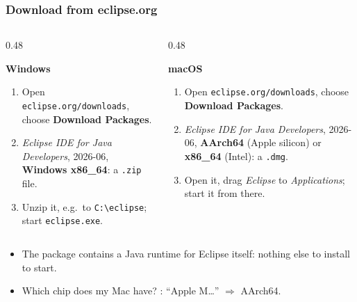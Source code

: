 \documentclass[aspectratio=169,10pt,compress]{beamer}
\newcommand{\win}{\textbf{Windows}}
\newcommand{\mac}{\textbf{macOS}}
\begin{document}
\begin{frame}[t,fragile] \frametitle{Download from eclipse.org}
  \begin{columns}[T]
    \begin{column}{0.48\textwidth}
      \begin{block}{\win}
        \small
        \begin{enumerate}
          \item Open \texttt{eclipse.org/downloads}, choose \textbf{Download Packages}.
          \item \emph{Eclipse IDE for Java Developers}, 2026-06, \textbf{Windows x86\_64}: a \texttt{.zip} file.
          \item Unzip it, e.g.\ to \texttt{C:\textbackslash eclipse}; start \texttt{eclipse.exe}.
        \end{enumerate}
      \end{block}
    \end{column}
    \begin{column}{0.48\textwidth}
      \begin{block}{\mac}
        \small
        \begin{enumerate}
          \item Open \texttt{eclipse.org/downloads}, choose \textbf{Download Packages}.
          \item \emph{Eclipse IDE for Java Developers}, 2026-06, \textbf{AArch64} (Apple silicon) or \textbf{x86\_64} (Intel): a \texttt{.dmg}.
          \item Open it, drag \emph{Eclipse} to \emph{Applications}; start it from there.
        \end{enumerate}
      \end{block}
    \end{column}
  \end{columns}
  \begin{itemize}\small
    \item The package contains a Java runtime for Eclipse itself: nothing else to install to start.
    \item Which chip does my Mac have? : ``Apple M\dots'' $\Rightarrow$ AArch64.
  \end{itemize}
\end{frame}
\end{document}
